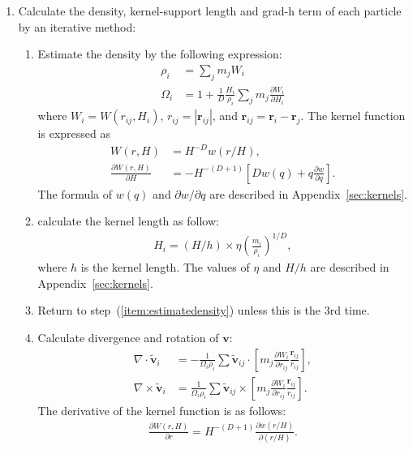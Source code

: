\documentclass[fleqn,dvipdfmx]{article}
\begin{document}
\begin{enumerate}
\item Calculate the density, kernel-support length and grad-h term of
  each particle by an iterative method:
  \begin{enumerate}
  \item Estimate the density by the following
    expression: \label{item:estimatedensity}
    \begin{align}
      \rho_i &= \sum_j m_j W_i \\ \Omega_i &= 1 + \frac{1}{D}
      \frac{H_i}{\rho_i} \sum_j m_j \frac{\partial W_i}{\partial H_i}
    \end{align}
    where $W_i=W(r_{ij},H_i)$, $r_{ij}=|\bm{r}_{ij}|$, and
    $\bm{r}_{ij}=\bm{r}_i-\bm{r}_j$. The kernel function is expressed
    as
    \begin{align}
      W(r,H) &= H^{-D} w(r/H), \\ \frac{\partial
        W(r,H)}{\partial H} &= -H^{-(D+1)} \left[ D w(q) + q
        \frac{\partial w}{\partial q} \right].
    \end{align}
    The formula of $w(q)$ and $\partial w/\partial q$ are described in
    Appendix~\ref{sec:kernels}.
  \item calculate the kernel length as follow:
    \begin{align}
      H_i = (H/h) \times \eta \left( \frac{m_i}{\rho_i} \right)^{1/D},
    \end{align}
    where $h$ is the kernel length. The values of $\eta$ and $H/h$ are
    described in Appendix~\ref{sec:kernels}.
  \item Return to step~(\ref{item:estimatedensity}) unless this is the
    3rd time.
  \item Calculate divergence and rotation of $\bm{v}$:
    \begin{align}
      \nabla \cdot \tilde{\bm{v}}_i &= - \frac{1}{\Omega_i \rho_i} \sum
      \tilde{\bm{v}}_{ij} \cdot \left[ m_j \frac{\partial
          W_i}{\partial r_{ij}} \frac{\bm{r}_{ij}}{r_{ij}} \right], \\
      \nabla \times \tilde{\bm{v}}_i &= \frac{1}{\Omega_i \rho_i} \sum
      \tilde{\bm{v}}_{ij} \times \left[ m_j \frac{\partial
          W_i}{\partial r_{ij}} \frac{\bm{r}_{ij}}{r_{ij}} \right].
    \end{align}
    The
    derivative of the kernel function is as follows:
    \begin{align}
      \frac{\partial W(r,H)}{\partial r} = H^{-(D+1)} \frac{\partial
        w(r/H)}{\partial (r/H)}.
    \end{align}
  \end{enumerate}
  

\end{enumerate}
\end{document}
